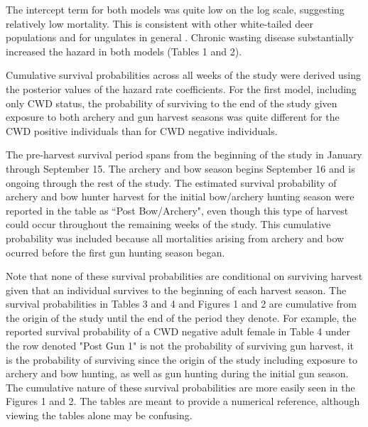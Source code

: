 \documentclass[12pt]{article}\usepackage[]{graphicx}\usepackage[]{color}
\begin{document}
The intercept term for both models was quite low on the log scale, suggesting relatively low mortality. This is consistent with other white-tailed deer populations and for ungulates in general \citep{gaillard_population_1998}. Chronic wasting disease substantially increased the hazard in both models (Tables 1 and 2). 

Cumulative survival probabilities across all weeks of the study were derived using the posterior values of the hazard rate coefficients. For the first model, including only CWD status, the probability of surviving to the end of the study given exposure to both archery and gun harvest seasons was quite different for the CWD positive individuals than for CWD negative individuals.

The pre-harvest survival period spans from the beginning of the study in January through September 15. The archery and bow season begins September 16 and is ongoing through the rest of the study. The estimated survival probability of archery and bow hunter harvest for the initial bow/archery hunting season were reported in the table as ``Post Bow/Archery", even though this type of harvest could occur throughout the remaining weeks of the study. This cumulative probability was included because all mortalities arising from archery and bow ocurred before the first gun hunting season began. 

Note that none of these survival probabilities are conditional on surviving harvest given that an individual survives to the beginning of each harvest season. The survival probabilities in Tables 3 and 4 and Figures 1 and 2 are cumulative from the origin of the study until the end of the period they denote. For example, the reported survival probability of a CWD negative adult female in Table 4 under the row denoted "Post Gun 1" is not the probability of surviving gun harvest, it is the probability of surviving since the origin of the study including exposure to archery and bow hunting, as well as gun hunting during the initial gun season. The cumulative nature of these survival probabilities are more easily seen in the Figures 1 and 2. The tables are meant to provide a numerical reference, although viewing the tables alone may be confusing. 

\vspace{1 cm}
\end{document}
